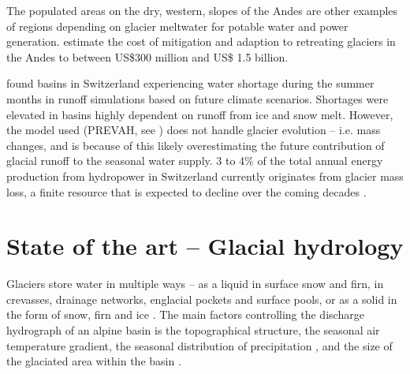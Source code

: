 \documentclass[12pt, a4paper]{article}
\begin{document}
The populated areas on the dry, western, slopes of the Andes are other examples
of regions depending on glacier meltwater for potable water and power
generation. \textcite{vergaraEconomicImpactsRapid2007} estimate the cost of
mitigation and adaption to retreating glaciers in the Andes to between US\$300
million and US\$ 1.5 billion.

\textcite{brunnerPresentFutureWater2019} found basins in Switzerland
experiencing water shortage during the summer months in runoff simulations based
on future climate scenarios. Shortages were elevated in basins highly dependent
on runoff from ice and snow melt. However, the model used (PREVAH, see
\cite{viviroliIntroductionHydrologicalModelling2009}) does not handle glacier
evolution -- i.e. mass changes, and is because of this likely overestimating the
future contribution of glacial runoff to the seasonal water supply. 3 to 4\% of
the total annual energy production from hydropower in Switzerland currently
originates from glacier mass loss, a finite resource that is expected to decline
over the coming decades \parencite{schaefliRoleGlacierRetreat2019}. 





\section{State of the art -- Glacial hydrology}
Glaciers store water in multiple ways -- as a liquid in surface snow and firn,
in crevasses, drainage networks, englacial pockets and surface pools, or as a
solid in the form of snow, firn and ice
\parencite{janssonConceptGlacierStorage2003}. The main factors controlling the
discharge hydrograph of an alpine basin is the topographical structure, the
seasonal air temperature gradient, the seasonal distribution of precipitation
\parencite{zappaSeasonalWaterBalance2003}, and the size of the glaciated area
within the basin \parencite{janssonConceptGlacierStorage2003}. 
\end{document}
